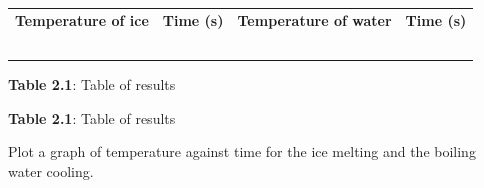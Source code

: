           \begin{table}[H]
        \begin{center}
      \label{m38736*uid434}
    \noindent
      \tablelasttail{}
      \begin{xtabular}[t]{|l|l|l|l|}\hline
                \textbf{Temperature of ice}
               &
                \textbf{Time (s)}
               &
                \textbf{Temperature of water}
               &
                \textbf{Time (s)}
     \tabularnewline{}
         &
         &
         &
     \tabularnewline{}
         &
         &
         &
     \tabularnewline{}
         &
         &
         &
     \tabularnewline{}
         &
         &
         &
     \tabularnewline{}
         &
         &
         &
     \tabularnewline{}
    \end{xtabular}
      \end{center}
    \begin{center}{\small\bfseries Table 2.1}: Table of results\end{center}
    \begin{caption}{\small\bfseries Table 2.1}: Table of results\end{caption}
\end{table}
    \par
Plot a graph of temperature against time for the ice melting and the boiling water cooling. 
